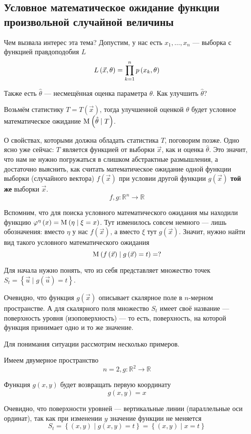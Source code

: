 \subsection{Условное математическое ожидание функции произвольной случайной величины}

Чем вызвала интерес эта тема?
Допустим, у нас есть $x_1, \dots, x_n$ --- выборка с функцией правдоподобия $L$
$$L\left( \vec{x}, \theta \right) = \prod_{k=1}^n p\left(x_k, \theta\right)$$

Также есть $\hat{\theta}$ --- несмещённая оценка параметра $\theta$.
Как улучшить $\hat{\theta}$?

Возьмём статистику $T = T\left( \vec{x} \right)$,
тогда улучшенной оценкой $\theta$ будет условное математическое ожидание
$\mathrm{M}_{} \left( \hat{\theta} \mid T \right)$.

О свойствах, которыми должна обладать статистика $T$, поговорим позже.
Одно ясно уже сейчас: $T$ является функцией от выборки $\vec{x}$,
как и оценка $\hat{\theta}$.
Это значит, что нам не нужно погружаться в слишком абстрактные размышления,
а достаточно выяснить, как считать математическое ожидание
одной функции выборки (случайного вектора) $f\left( \vec{x} \right)$
при условии другой функции $g\left( \vec{x} \right)$
\textbf{той же} выборки $\vec{x}$.
$$f,g: \mathbb{R}^n \rightarrow \mathbb{R}$$

Вспомним, что для поиска условного математического ожидания
мы находили функцию
$\varphi^{\eta}\left( x \right) = \mathrm{M}_{} \left( \eta \mid \xi = x \right)$.
Тут изменилось совсем немного --- лишь обозначения:
вместо $\eta$ у нас $f\left( \vec{x} \right)$,
а вместо $\xi$ тут $g\left( \vec{x} \right)$.
Значит, нужно найти вид такого условного математического ожидания
$$\mathrm{M}_{} \left( f\left( \vec{x} \right)
    \mid g\left( \vec{x} \right) = t \right) = ?$$

Для начала нужно понять, что из себя представляет множество точек
$S_t = \left\{ \vec{u} \mid g\left( \vec{u} \right) = t \right\}$.

Очевидно, что функция $g\left( \vec{x} \right)$
описывает скалярное поле в $n$-мерном пространстве.
А для скалярного поля множество $S_t$
имеет своё название --- поверхность уровня (изоповерхность) --- то есть,
поверхность, на которой функция принимает одно и то же значение.

Для понимания ситуации рассмотрим несколько примеров.

\begin{example}
    Имеем двумерное пространство
    $$n=2, g: \mathbb{R}^2 \rightarrow \mathbb{R}$$

    Функция $g\left( x, y \right)$ будет возвращать первую координату
    $$g\left( x, y \right) = x$$

    Очевидно, что поверхности уровней --- вертикальные линии
    (параллельные оси ординат), так как при изменении $y$
    значение функции не меняется
    $$S_t
        = \left\{ \left( x, y \right) \mid g\left( x, y \right) = t \right\}
        = \left\{ \left( x, y \right) \mid x = t \right\}$$
\end{example}

